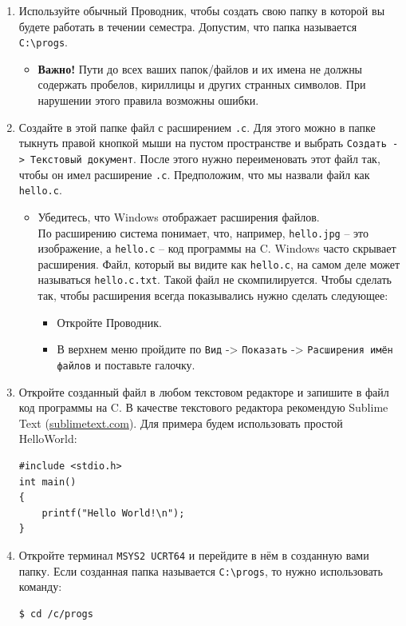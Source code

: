 \documentclass{article}
\begin{document}
\begin{enumerate}
\item Используйте обычный Проводник, чтобы создать свою папку в которой вы будете работать в течении семестра. Допустим, что папка называется \texttt{C:\textbackslash progs}. 
\begin{itemize}
\item \textbf{Важно!} Пути до всех ваших папок/файлов и их имена не должны содержать пробелов, кириллицы и других странных символов. При нарушении этого правила возможны ошибки. 
\end{itemize}



\item Создайте в этой папке файл с расширением \texttt{.c}. Для этого можно в папке тыкнуть правой кнопкой мыши на пустом пространстве и выбрать \texttt{Создать -> Текстовый документ}. После этого нужно переименовать этот файл так, чтобы он имел расширение \texttt{.c}. Предположим, что мы назвали файл как \texttt{hello.c}. 
\begin{itemize}
\item Убедитесь, что Windows отображает расширения файлов.\\
По расширению система понимает, что, например, \texttt{hello.jpg} -- это изображение, а \texttt{hello.c} -- код программы на C.
Windows часто скрывает расширения. Файл, который вы видите как \texttt{hello.c}, на самом деле может называться \texttt{hello.c.txt}. Такой файл не скомпилируется.
Чтобы сделать так, чтобы расширения всегда показывались нужно сделать следующее:
\begin{itemize}
\item Откройте Проводник.
\item В верхнем меню пройдите по \texttt{Вид} -> \texttt{Показать} -> \texttt{Расширения имён файлов} и поставьте галочку.
\end{itemize}
\end{itemize}

\item Откройте созданный файл в любом текстовом редакторе и запишите в файл код программы на C. В качестве текстового редактора рекомендую Sublime Text (\href{https://www.sublimetext.com/}{sublimetext.com}). Для примера будем использовать простой HelloWorld:
\begin{lstlisting}
#include <stdio.h>
int main()
{
    printf("Hello World!\n");
}
\end{lstlisting} 

\item Откройте терминал \texttt{MSYS2 UCRT64} и перейдите в нём в созданную вами папку. Если созданная папка называется \texttt{C:\textbackslash progs}, то нужно использовать команду:
\begin{lstlisting}[style=csMiptBash]
$ cd /c/progs
\end{lstlisting}


\end{enumerate}
\end{document}

